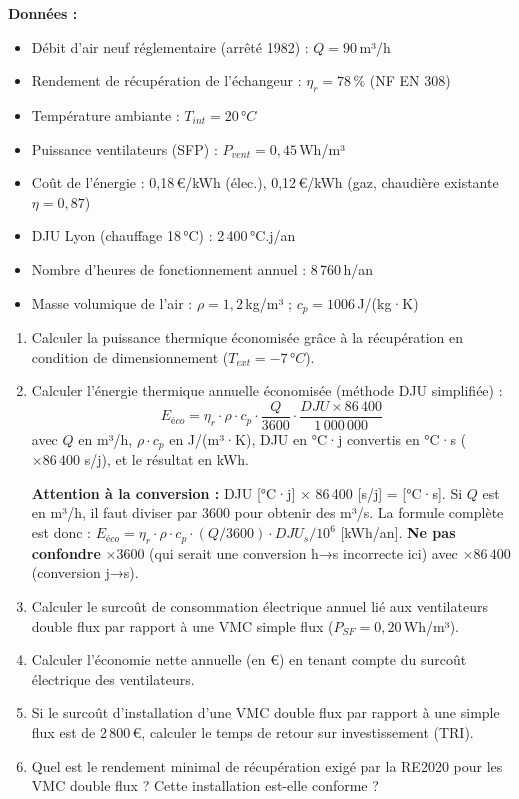 \textbf{Données :}
\begin{itemize}
  \item Débit d'air neuf réglementaire (arrêté 1982) : $Q = 90$\,m³/h
  \item Rendement de récupération de l'échangeur : $\eta_r = 78\,\%$ (NF EN 308)
  \item Température ambiante : $T_{int} = 20\,°C$
  \item Puissance ventilateurs (SFP) : $P_{vent} = 0{,}45$\,Wh/m³
  \item Coût de l'énergie : 0,18\,€/kWh (élec.), 0,12\,€/kWh (gaz, chaudière existante $\eta = 0{,}87$)
  \item DJU Lyon (chauffage 18\,°C) : 2\,400\,°C.j/an
  \item Nombre d'heures de fonctionnement annuel : 8\,760\,h/an
  \item Masse volumique de l'air : $\rho = 1{,}2$\,kg/m³ ; $c_p = 1006$\,J/(kg·K)
\end{itemize}

\begin{enumerate}
  \item Calculer la puissance thermique économisée grâce à la récupération en condition de dimensionnement ($T_{ext} = -7\,°C$).
  \item Calculer l'énergie thermique annuelle économisée (méthode DJU simplifiée) :
    \[
      E_{éco} = \eta_r \cdot \rho \cdot c_p \cdot \frac{Q}{3600} \cdot \frac{DJU \times 86\,400}{1\,000\,000}
    \]
    avec $Q$ en m³/h, $\rho \cdot c_p$ en J/(m³·K), DJU en °C·j convertis en °C·s ($\times 86\,400$ s/j), et le résultat en kWh.

    \begin{remarque}
    \textbf{Attention à la conversion :} DJU [°C·j] $\times$ 86\,400 [s/j] = [°C·s]. Si $Q$ est en m³/h, il faut diviser par 3600 pour obtenir des m³/s. La formule complète est donc :
    $E_{éco} = \eta_r \cdot \rho \cdot c_p \cdot (Q/3600) \cdot DJU_{s} / 10^6$ [kWh/an].
    \textbf{Ne pas confondre} $\times 3600$ (qui serait une conversion h→s incorrecte ici) avec $\times 86\,400$ (conversion j→s).
    \end{remarque}
  \item Calculer le surcoût de consommation électrique annuel lié aux ventilateurs double flux par rapport à une VMC simple flux ($P_{SF} = 0{,}20$\,Wh/m³).
  \item Calculer l'économie nette annuelle (en €) en tenant compte du surcoût électrique des ventilateurs.
  \item Si le surcoût d'installation d'une VMC double flux par rapport à une simple flux est de 2\,800\,€, calculer le temps de retour sur investissement (TRI).
  \item Quel est le rendement minimal de récupération exigé par la RE2020 pour les VMC double flux ? Cette installation est-elle conforme ?
\end{enumerate}


